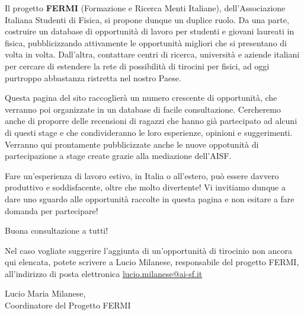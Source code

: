 \documentclass[a4paper,10pt]{article}
\begin{document}
Il progetto \textbf{FERMI} (Formazione e Ricerca Menti Italiane), dell’Associazione Italiana Studenti di Fisica, si propone dunque un duplice ruolo. Da una parte, costruire un database di opportunità di lavoro per studenti e giovani laureati in fisica, pubblicizzando attivamente le opportunità migliori che si presentano di volta in volta. Dall’altra, contattare centri di ricerca, università e aziende italiani per cercare di estendere la rete di possibilità di tirocini per fisici, ad oggi purtroppo abbastanza ristretta nel nostro Paese. \newline

Questa pagina del sito raccoglierà un numero crescente di opportunità, che verranno poi organizzate in un database di facile consultazione. Cercheremo anche di proporre delle recensioni di ragazzi che hanno già partecipato ad alcuni di questi stage e che condivideranno le loro esperienze, opinioni e suggerimenti. Verranno qui prontamente pubblicizzate anche le nuove oppotunità di partecipazione a stage create grazie alla mediazione dell’AISF. \newline

Fare un’esperienza di lavoro estivo, in Italia o all’estero, può essere davvero produttivo e soddisfacente, oltre che molto divertente! Vi invitiamo dunque a dare uno sguardo alle opportunità raccolte in questa pagina e non esitare a fare domanda per partecipare! \newline

Buona consultazione a tutti! \newline

Nel caso vogliate suggerire l’aggiunta di un’opportunità di tirocinio non ancora qui elencata, potete scrivere a Lucio Milanese, responsabile del progetto FERMI, all’indirizzo di posta elettronica \href{mailto:lucio.milanese@ai-sf.it}{lucio.milanese@ai-sf.it} \newline

\begin{flushright}
  Lucio Maria Milanese, \\
Coordinatore del Progetto FERMI
\end{flushright}
\newpage

\tableofcontents


\end{document}
